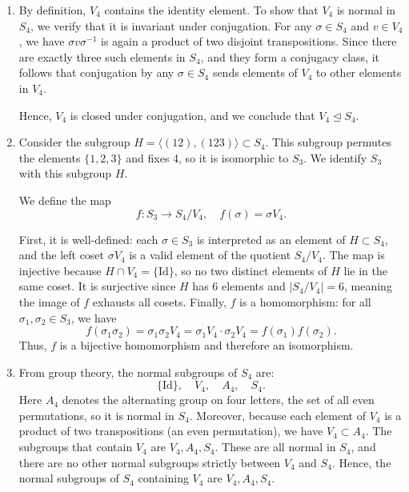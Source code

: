 \documentclass[12pt]{article}
\begin{document}
\begin{enumerate}[label=(\arabic*)] 

\item

By definition, \( V_4 \) contains the identity element. To show that \( V_4 \) is normal in \( S_4 \), we verify that it is invariant under conjugation. 
For any \( \sigma \in S_4 \) and \( v \in V_4 \), we have \( \sigma v \sigma^{-1} \) is again a product of two disjoint transpositions. 
Since there are exactly three such elements in \( S_4 \), and they form a conjugacy class, it follows that conjugation by any \( \sigma \in S_4 \) sends elements of \( V_4 \) to other elements in \( V_4 \).

Hence, \( V_4 \) is closed under conjugation, and we conclude that \( V_4 \trianglelefteq S_4 \).

\item 
Consider the subgroup \( H = \langle (12), (123) \rangle \subset S_4 \). This subgroup permutes the elements \( \{1, 2, 3\} \) and fixes 4, so it is isomorphic to \( S_3 \). We identify \( S_3 \) with this subgroup \( H \).

\medskip

We define the map
\[
f : S_3 \to S_4 / V_4, \quad f(\sigma) = \sigma V_4.
\]

First, it is well-defined: each \( \sigma \in S_3 \) is interpreted as an element of \( H \subset S_4 \), and the left coset \( \sigma V_4 \) is a valid element of the quotient \( S_4 / V_4 \). The map is injective because \( H \cap V_4 = \{ \text{Id} \} \), so no two distinct elements of \( H \) lie in the same coset. It is surjective since \( H \) has 6 elements and \( |S_4 / V_4| = 6 \), meaning the image of \( f \) exhausts all cosets. Finally, \( f \) is a homomorphism: for all \( \sigma_1, \sigma_2 \in S_3 \), we have
\[
f(\sigma_1 \sigma_2) = \sigma_1 \sigma_2 V_4 = \sigma_1 V_4 \cdot \sigma_2 V_4 = f(\sigma_1) f(\sigma_2).
\]
Thus, \( f \) is a bijective homomorphism and therefore an isomorphism.

\item From group theory, the normal subgroups of \( S_4 \) are:
\[
\{ \text{Id} \}, \quad V_4, \quad A_4, \quad S_4.
\]
Here \(A_4\) denotes the alternating group on four letters, the set of all even permutations, so it is normal in \(S_4\). Moreover, because each element of \(V_4\) is a product of two transpositions (an even permutation), we have \(V_4 \subset A_4\).
The subgroups that contain \( V_4 \) are \(V_4, A_4, S_4.\) These are all normal in \( S_4 \), and there are no other normal subgroups strictly between \( V_4 \) and \( S_4 \). 
Hence, the normal subgroups of \( S_4 \) containing \( V_4 \) are \(V_4, A_4, S_4.\) 
\end{enumerate}
\end{document}
